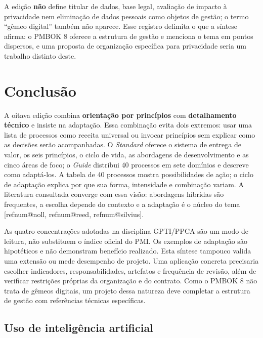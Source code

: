 \documentclass[11pt,a4paper]{article}
\makeatletter
\newif\ifavisofinal  \avisofinaltrue    %
\newcommand{\refnum}[1]{\csname refnum@#1\endcsname}
\makeatother
\begin{document}
A edição \textbf{não} define titular de dados, base legal, avaliação de impacto à privacidade nem eliminação de dados pessoais como objetos de gestão; o termo \textquotedblleft{}gêmeo digital\textquotedblright{} também não aparece. Esse registro delimita o que a síntese afirma: o PMBOK 8 oferece a estrutura de gestão e menciona o tema em pontos dispersos, e uma proposta de organização específica para privacidade seria um trabalho distinto deste.

\section{Conclusão}

A oitava edição combina \textbf{orientação por princípios} com \textbf{detalhamento técnico} e insiste na adaptação. Essa combinação evita dois extremos: usar uma lista de processos como receita universal ou invocar princípios sem explicar como as decisões serão acompanhadas. O \textit{Standard} oferece o sistema de entrega de valor, os seis princípios, o ciclo de vida, as abordagens de desenvolvimento e as cinco áreas de foco; o \textit{Guide} distribui 40 processos em sete domínios e descreve como adaptá-los. A tabela de 40 processos mostra possibilidades de ação; o ciclo de adaptação explica por que sua forma, intensidade e combinação variam. A literatura consultada converge com essa visão: abordagens híbridas são frequentes, a escolha depende do contexto e a adaptação é o núcleo do tema [\refnum{noll}, \refnum{reed}, \refnum{silvius}].

As quatro concentrações adotadas na disciplina GPTI/PPCA são um modo de leitura, não substituem o índice oficial do PMI. Os exemplos de adaptação são hipotéticos e não demonstram benefício realizado. Esta síntese tampouco valida uma extensão ou mede desempenho de projeto. Uma aplicação concreta precisaria escolher indicadores, responsabilidades, artefatos e frequência de revisão, além de verificar restrições próprias da organização e do contrato. Como o PMBOK 8 não trata de gêmeos digitais, um projeto dessa natureza deve completar a estrutura de gestão com referências técnicas específicas.

\ifavisofinal
\subsection{Uso de inteligência artificial}
\end{document}
